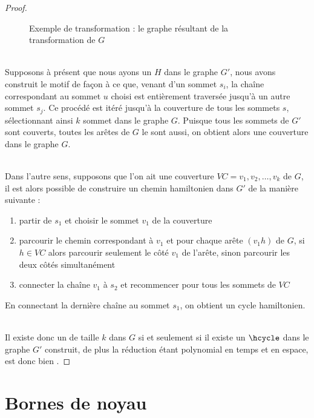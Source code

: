 \begin{proof}
    \begin{figure}
        \begin{center}
            \begin{tikzpicture}[scale=0.6, every node/.style={transform shape}, tmp/.style={inner
                    sep=0mm, node distance=3mm}]
                
            \end{tikzpicture}
            \caption{Exemple de transformation : le graphe résultant de la transformation de $G$}
            \label{hcycle_finish}
        \end{center}
    \end{figure}


    ~\\
    Supposons à présent que nous ayons un \hcycle $H$ dans le graphe $G'$, nous avons construit le
    motif de façon à ce que, venant d'un sommet $s_i$, la chaîne correspondant au sommet $u$ choisi
    est entièrement traversée jusqu'à un autre sommet $s_j$. Ce procédé est itéré jusqu'à la
    couverture de tous les sommets $s$, sélectionnant ainsi $k$ sommet dans le graphe $G$. Puisque
    tous les sommets de $G'$ sont couverts, toutes les arêtes de $G$ le sont aussi, on obtient alors
    une couverture dans le graphe $G$.

    ~\\
    Dans l'autre sens, supposons que l'on ait une couverture $VC = {v_1, v_2, \dots, v_k}$ de $G$,
    il est alors possible de construire un chemin hamiltonien dans $G'$ de la manière suivante :
    \begin{enumerate}
        \item partir de $s_1$ et choisir le sommet $v_1$ de la couverture
        \item parcourir le chemin correspondant à $v_1$ et pour chaque arête $(v_1h)$ de $G$, si $h
            \in VC$ alors parcourir seulement le côté $v_1$ de l'arête, sinon parcourir les deux
            côtés simultanément
        \item connecter la chaîne $v_1$ à $s_2$ et recommencer pour tous les sommets de $VC$
    \end{enumerate}
    En connectant la dernière chaîne au sommet $s_1$, on obtient un cycle hamiltonien.

    ~\\
    Il existe donc un \vcover de taille $k$ dans $G$ si et seulement si il existe un $\hcycle$ dans
    le graphe $G'$ construit, de plus la réduction étant polynomial en temps et en espace, \hcycle
    est donc bien \npc.

\end{proof}

\section{Bornes de noyau}
\label{hcycle_kbounds}

